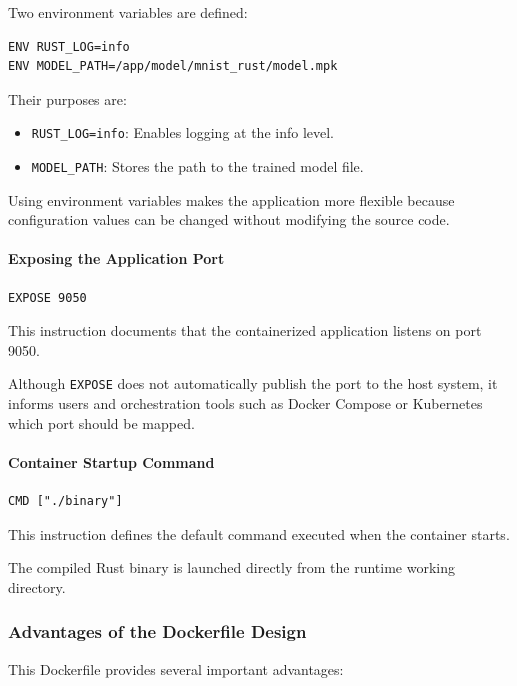 \documentclass[10pt,a4paper,twocolumn]{article}
\begin{document}
Two environment variables are defined:

\begin{verbatim}
ENV RUST_LOG=info
ENV MODEL_PATH=/app/model/mnist_rust/model.mpk
\end{verbatim}

Their purposes are:

\begin{itemize}
    \item \texttt{RUST\_LOG=info}: Enables logging at the info level.
    \item \texttt{MODEL\_PATH}: Stores the path to the trained model file.
\end{itemize}

Using environment variables makes the application more flexible because configuration values can be changed without modifying the source code.

\paragraph{Exposing the Application Port}

\begin{verbatim}
EXPOSE 9050
\end{verbatim}

This instruction documents that the containerized application listens on port 9050.

Although \texttt{EXPOSE} does not automatically publish the port to the host system, it informs users and orchestration tools such as Docker Compose or Kubernetes which port should be mapped.

\paragraph{Container Startup Command}

\begin{verbatim}
CMD ["./binary"]
\end{verbatim}

This instruction defines the default command executed when the container starts.

The compiled Rust binary is launched directly from the runtime working directory.

\subsubsection{Advantages of the Dockerfile Design}

This Dockerfile provides several important advantages:
\end{document}
